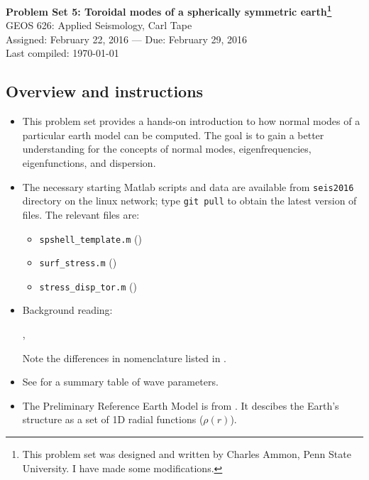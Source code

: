 \documentclass[11pt,titlepage,fleqn]{article}
\begin{document}

\begin{spacing}{1.2}
\centering
{\large \bf Problem Set 5: Toroidal modes of a spherically symmetric earth\footnote{This problem set was designed and written by Charles Ammon, Penn State University. I have made some modifications.}} \\
GEOS 626: Applied Seismology, Carl Tape \\
Assigned: February 22, 2016 --- Due: February 29, 2016 \\
Last compiled: \today \\
\end{spacing}


\subsection*{Overview and instructions}

\begin{itemize}
\item This problem set provides a hands-on introduction to how normal modes of a particular earth model can be computed. The goal is to gain a better understanding for the concepts of normal modes, eigenfrequencies, eigenfunctions, and dispersion.

\item The necessary starting Matlab scripts and data are available from \verb+seis2016+ directory on the linux network; type \verb+git pull+ to obtain the latest version of files. The relevant files are:
%
\begin{itemize}
\item \verb+spshell_template.m+ ()
\item \verb+surf_stress.m+ ()
\item \verb+stress_disp_tor.m+ ()
\end{itemize}

\item Background reading:

\citet[][Section 2.9]{SteinWysession}, \citet[][Ch.~8]{DT}

Note the differences in nomenclature listed in .

\item See  for a summary table of wave parameters.

\item The Preliminary Reference Earth Model is from \citet{PREM}. It descibes the Earth's structure as a set of 1D radial functions (\eg $\rho(r)$).

\end{itemize}
\end{document}
